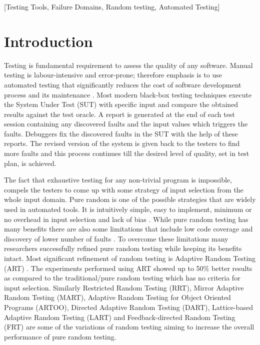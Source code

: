 \documentclass{acm_proc_article-sp}
\begin{document}
[Testing Tools, Failure Domains, Random testing, Automated Testing]

\section{Introduction}\label{sec:intro}

Testing is fundamental requirement to assess the quality of any software. Manual testing is labour-intensive and error-prone; therefore emphasis is to use automated testing that significantly reduces the cost of software development process and its maintenance \cite{Beizer1995}. Most modern black-box testing techniques execute the System Under Test (SUT) with specific input and compare the obtained results against the test oracle. A report is generated at the end of each test session containing any discovered faults and the input values which triggers the faults. Debuggers fix the discovered faults in the SUT with the help of these reports. The revised version of the system is given back to the testers to find more faults and this process continues till the desired level of quality, set in test plan, is achieved.

The fact that exhaustive testing for any non-trivial program is impossible, compels the testers to come up with some strategy of input selection from the whole input domain. Pure random is one of the possible strategies that are widely used in automated tools. It is intuitively simple, easy to implement, minimum or no overhead in input selection and lack of bias \cite{Ciupa2008, Forrester2000, Hamlet1994, Linger1993}. While pure random testing has many benefits there are also some limitations that include low code coverage \cite{Offutt1996} and discovery of lower number of faults \cite{Chen1994}. To overcome these limitations many researchers successfully refined pure random testing while keeping its benefits intact. Most significant refinement of random testing is Adaptive Random Testing (ART) \cite{Chen2008}. The experiments performed using ART showed up to 50\% better results as compared to the traditional/pure random testing which has no criteria for input selection.  Similarly Restricted Random Testing (RRT), Mirror Adaptive Random Testing (MART), Adaptive Random Testing for Object Oriented Programs (ARTOO), Directed Adaptive Random Testing (DART), Lattice-based Adaptive Random Testing (LART) and Feedback-directed Random Testing (FRT) \cite{Chan2006, Chen2004, Ciupa2008,  Godefroid2005, Mayer2005, Pacheco2007} are some of the variations of random testing aiming to increase the overall performance of pure random testing.
\end{document}
